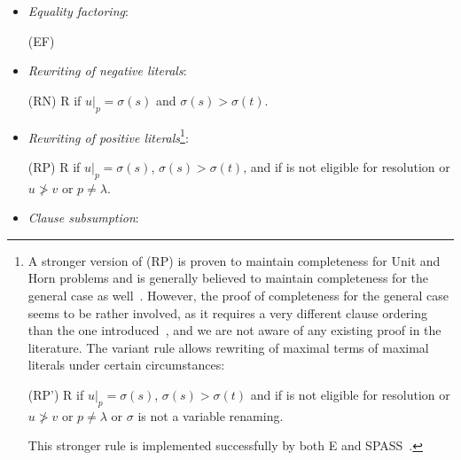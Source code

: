 \documentclass{article}
\begin{document}
\begin{definition}
\begin{itemize}
  \item \emph{Equality factoring}:
    
    \bigskip (EF) 

    
  \item \emph{Rewriting of negative literals}:
    
    \bigskip (RN)  {
      \phantom{ae}  \vee R} {if
      $u|_p = \sigma(s)$ and $\sigma(s)>\sigma(t)$.}

    
  \item \emph{Rewriting of positive
      literals}\footnote{A stronger version of (RP)
      is proven to maintain completeness for Unit and Horn problems
      and is generally believed to maintain completeness for the
      general case as well~\cite{Bachmair:personal-98}.  However, the
      proof of completeness for the general case seems to be rather
      involved, as it requires a very different clause ordering than
      the one introduced~\cite{BG94}, and we are not aware of any
      existing proof in the literature. The variant rule allows
      rewriting of maximal terms of maximal literals under certain
      circumstances:
       
       \medskip
       (RP')  {
         \phantom{ae}  \vee R} {if
       $u|_p = \sigma(s)$, $\sigma(s)>\sigma(t)$ and
       if  is not eligible for
       resolution or $u \not> v$ or $p \not=
       \lambda$ or $\sigma$ is not a variable renaming.}
     
     \medskip \noindent This stronger rule is implemented successfully
     by both E and
     SPASS~\cite{Weidenbach:personal-99}.}:
   
   \bigskip (RP) 
   { \phantom{ae}  \vee
     R} {if $u|_p = \sigma(s)$, $\sigma(s)>\sigma(t)$, and if
      is not eligible for resolution or $u \not> v$ or $p
     \not= \lambda$.}
    
 \item \emph{Clause subsumption}:
       

\end{itemize}
\end{definition}
\end{document}
